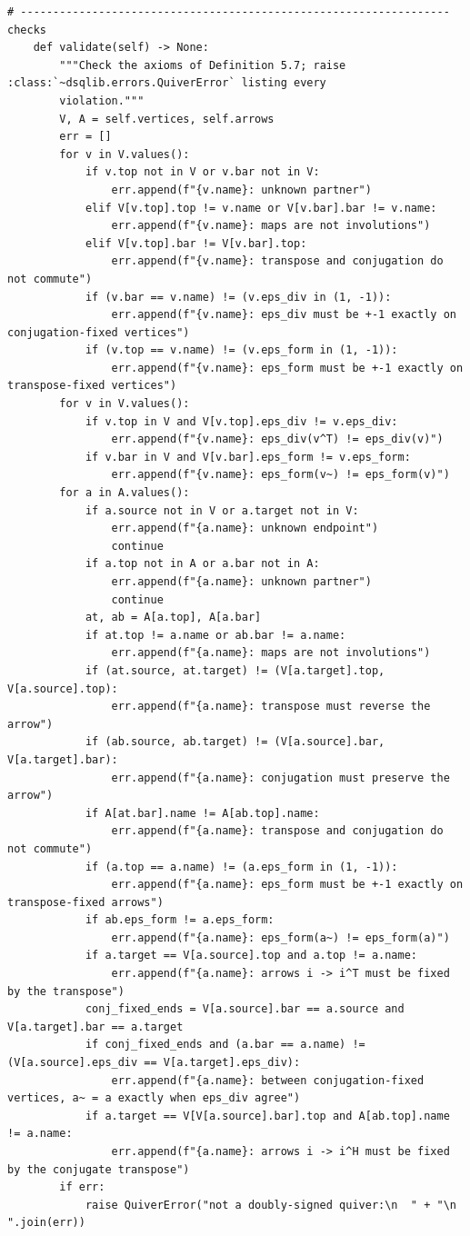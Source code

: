 \documentclass[12pt, a4paper]{report}
\theoremstyle{plain}
\theoremstyle{definition}
\theoremstyle{remark}
\theoremstyle{plain}
\begin{document}
\begin{lstlisting}[style=dsqcode]
    # ------------------------------------------------------------------ checks
    def validate(self) -> None:
        """Check the axioms of Definition 5.7; raise :class:`~dsqlib.errors.QuiverError` listing every
        violation."""
        V, A = self.vertices, self.arrows
        err = []
        for v in V.values():
            if v.top not in V or v.bar not in V:
                err.append(f"{v.name}: unknown partner")
            elif V[v.top].top != v.name or V[v.bar].bar != v.name:
                err.append(f"{v.name}: maps are not involutions")
            elif V[v.top].bar != V[v.bar].top:
                err.append(f"{v.name}: transpose and conjugation do not commute")
            if (v.bar == v.name) != (v.eps_div in (1, -1)):
                err.append(f"{v.name}: eps_div must be +-1 exactly on conjugation-fixed vertices")
            if (v.top == v.name) != (v.eps_form in (1, -1)):
                err.append(f"{v.name}: eps_form must be +-1 exactly on transpose-fixed vertices")
        for v in V.values():
            if v.top in V and V[v.top].eps_div != v.eps_div:
                err.append(f"{v.name}: eps_div(v^T) != eps_div(v)")
            if v.bar in V and V[v.bar].eps_form != v.eps_form:
                err.append(f"{v.name}: eps_form(v~) != eps_form(v)")
        for a in A.values():
            if a.source not in V or a.target not in V:
                err.append(f"{a.name}: unknown endpoint")
                continue
            if a.top not in A or a.bar not in A:
                err.append(f"{a.name}: unknown partner")
                continue
            at, ab = A[a.top], A[a.bar]
            if at.top != a.name or ab.bar != a.name:
                err.append(f"{a.name}: maps are not involutions")
            if (at.source, at.target) != (V[a.target].top, V[a.source].top):
                err.append(f"{a.name}: transpose must reverse the arrow")
            if (ab.source, ab.target) != (V[a.source].bar, V[a.target].bar):
                err.append(f"{a.name}: conjugation must preserve the arrow")
            if A[at.bar].name != A[ab.top].name:
                err.append(f"{a.name}: transpose and conjugation do not commute")
            if (a.top == a.name) != (a.eps_form in (1, -1)):
                err.append(f"{a.name}: eps_form must be +-1 exactly on transpose-fixed arrows")
            if ab.eps_form != a.eps_form:
                err.append(f"{a.name}: eps_form(a~) != eps_form(a)")
            if a.target == V[a.source].top and a.top != a.name:
                err.append(f"{a.name}: arrows i -> i^T must be fixed by the transpose")
            conj_fixed_ends = V[a.source].bar == a.source and V[a.target].bar == a.target
            if conj_fixed_ends and (a.bar == a.name) != (V[a.source].eps_div == V[a.target].eps_div):
                err.append(f"{a.name}: between conjugation-fixed vertices, a~ = a exactly when eps_div agree")
            if a.target == V[V[a.source].bar].top and A[ab.top].name != a.name:
                err.append(f"{a.name}: arrows i -> i^H must be fixed by the conjugate transpose")
        if err:
            raise QuiverError("not a doubly-signed quiver:\n  " + "\n  ".join(err))


\end{lstlisting}
\end{document}
